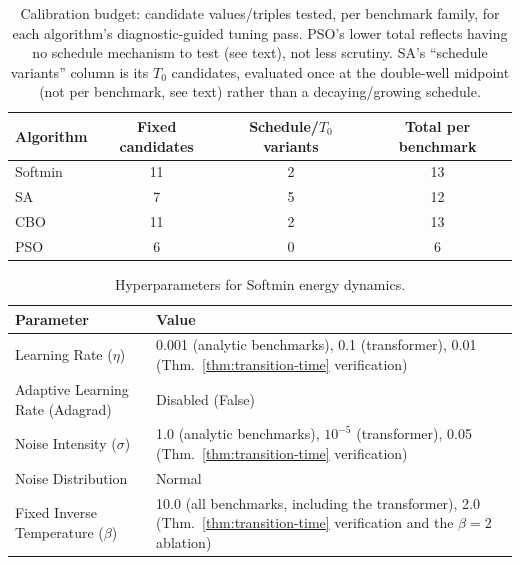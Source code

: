 \documentclass{article}
\theoremstyle{plain}
\theoremstyle{definition}
\theoremstyle{remark}
\begin{document}
\begin{table}[!htbp]
\centering
\caption{Calibration budget: candidate values/triples tested, per benchmark family, for each algorithm's diagnostic-guided tuning pass. PSO's lower total reflects having no schedule mechanism to test (see text), not less scrutiny. SA's ``schedule variants'' column is its $T_0$ candidates, evaluated once at the double-well midpoint (not per benchmark, see text) rather than a decaying/growing schedule.}
\label{tab:calibration_budget}
\begin{tabular}{@{}lccc@{}}
\toprule
\textbf{Algorithm} & \textbf{Fixed candidates} & \textbf{Schedule/$T_0$ variants} & \textbf{Total per benchmark} \\
\midrule
Softmin & 11 & 2 & 13 \\
SA & 7 & 5 & 12 \\
CBO & 11 & 2 & 13 \\
PSO & 6 & 0 & 6 \\
\bottomrule
\end{tabular}
\end{table}

\begin{table}[!htbp]
\centering
\caption{Hyperparameters for Softmin energy dynamics.}
\label{tab:softmin_hyperparams}
\begin{tabular}{@{}lp{}@{}}
\toprule
\textbf{Parameter} & \textbf{Value} \\
\midrule
Learning Rate ($\eta$) & 0.001 (analytic benchmarks), 0.1 (transformer), 0.01 (Thm.~\ref{thm:transition-time} verification) \\
Adaptive Learning Rate (Adagrad) & Disabled (False) \\
Noise Intensity ($\sigma$) & 1.0 (analytic benchmarks), $10^{-5}$ (transformer), 0.05 (Thm.~\ref{thm:transition-time} verification) \\
Noise Distribution & Normal \\
Fixed Inverse Temperature ($\beta$) & 10.0 (all benchmarks, including the transformer), 2.0 (Thm.~\ref{thm:transition-time} verification and the $\beta=2$ ablation) \\
\bottomrule
\end{tabular}
\end{table}
\end{document}
